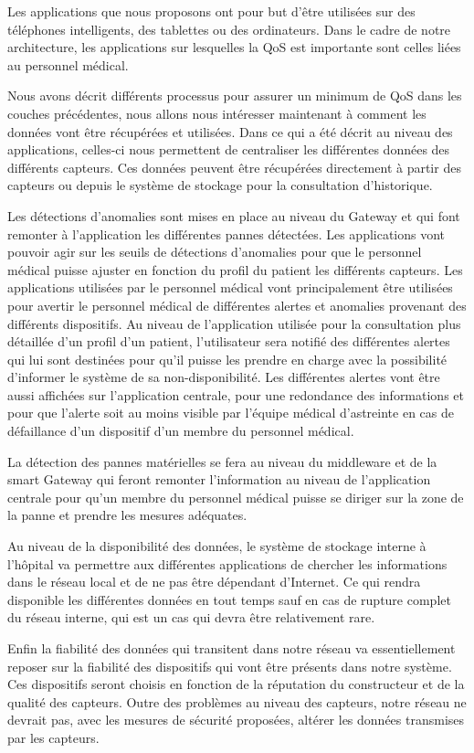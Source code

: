 Les applications que nous proposons ont pour but d’être utilisées sur des téléphones intelligents, des tablettes ou des ordinateurs. Dans le cadre de notre architecture, les applications sur lesquelles la QoS est importante sont celles liées au personnel médical.

Nous avons décrit différents processus pour assurer un minimum de QoS dans les couches précédentes, nous allons nous intéresser maintenant à comment les données vont être récupérées et utilisées. Dans ce qui a été décrit au niveau des applications, celles-ci nous permettent de centraliser les différentes données des différents capteurs. Ces données peuvent être récupérées directement à partir des capteurs ou depuis le système de stockage pour la consultation d’historique.

Les détections d’anomalies sont mises en place au niveau du Gateway et qui font remonter à l’application les différentes pannes détectées. Les applications vont pouvoir agir sur les seuils de détections d’anomalies pour que le personnel médical puisse ajuster en fonction du profil du patient les différents capteurs. Les applications utilisées par le personnel médical vont principalement être utilisées pour avertir le personnel médical de différentes alertes et anomalies provenant des différents dispositifs. Au niveau de l’application utilisée pour la consultation plus détaillée d’un profil d’un patient, l’utilisateur sera notifié des différentes alertes qui lui sont destinées pour qu’il puisse les prendre en charge avec la possibilité d’informer le système de sa non-disponibilité. Les différentes alertes vont être aussi affichées sur l’application centrale, pour une redondance des informations et pour que l’alerte soit au moins visible par l’équipe médical d’astreinte en cas de défaillance d’un dispositif d’un membre du personnel médical.

La détection des pannes matérielles se fera au niveau du middleware et de la smart Gateway qui feront remonter l’information au niveau de l’application centrale pour qu’un membre du personnel médical puisse se diriger sur la zone de la panne et prendre les mesures adéquates.

Au niveau de la disponibilité des données, le système de stockage interne à l’hôpital va permettre aux différentes applications de chercher les informations dans le réseau local et de ne pas être dépendant d’Internet.  Ce qui rendra disponible les différentes données en tout temps sauf en cas de rupture complet du réseau interne, qui est un cas qui devra être relativement rare.

Enfin la fiabilité des données qui transitent dans notre réseau va essentiellement reposer sur la fiabilité des dispositifs qui vont être présents dans notre système. Ces dispositifs seront choisis en fonction de la réputation du constructeur et de la qualité des capteurs. Outre des problèmes au niveau des capteurs, notre réseau ne devrait pas, avec les mesures de sécurité proposées, altérer les données transmises par les capteurs.      

